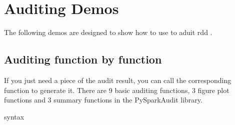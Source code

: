 \documentclass[letterpaper,12pt,english]{sphinxmanual}
\begin{document}
\chapter{Auditing Demos}
\label{\detokenize{demo:auditing-demos}}\label{\detokenize{demo:demo}}\label{\detokenize{demo::doc}}
The following demos are designed to show how to use  to aduit rdd .


\section{Auditing function by function}
\label{\detokenize{demo:auditing-function-by-function}}
If you just need a piece of the audit result, you can call the corresponding function to generate it.
There are 9 basic auditing functions, 3 figure plot functions and 3 summary functions in the PySparkAudit library.

syntax
\end{document}
